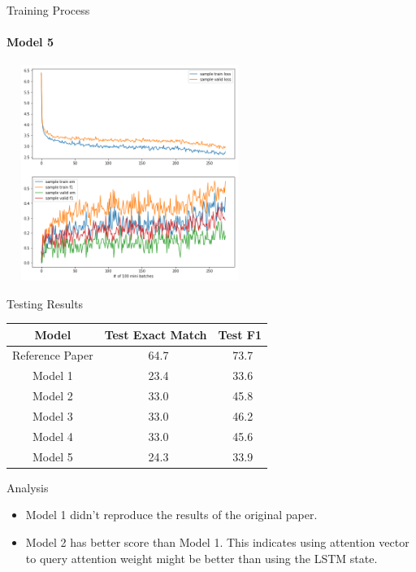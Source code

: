 \documentclass{beamer}
\begin{document}
\begin{frame}{Training Process}\framesubtitle{Model 5}
    \begin{center}
        \includegraphics[width=8cm, height=7cm]{figures/match_change3.png}
    \end{center}

\end{frame}

\begin{frame}{Testing Results}
    \begin{table}[htbp]\centering
      \begin{tabular}{|c|c|c|}
        \hline
        Model& Test Exact Match & Test F1 \\
        \hline\hline
        Reference Paper & \ 64.7 &\ 73.7 \\
        Model 1 & \ 23.4 &\ 33.6 \\
        Model 2 & \ 33.0 &\ 45.8 \\
        Model 3 & \ 33.0 &\ 46.2 \\
        Model 4 & \ 33.0 &\ 45.6 \\
        Model 5 & \ 24.3 &\ 33.9 \\
        \hline
      \end{tabular}
    \end{table}
\end{frame}

\begin{frame}{Analysis}
    \begin{itemize}
        \item Model 1 didn't reproduce the results of the original paper.
        \item Model 2 has better score than Model 1. This indicates using attention vector to query attention weight might be better than using the LSTM state.
    \end{itemize}
\end{frame}
\end{document}
